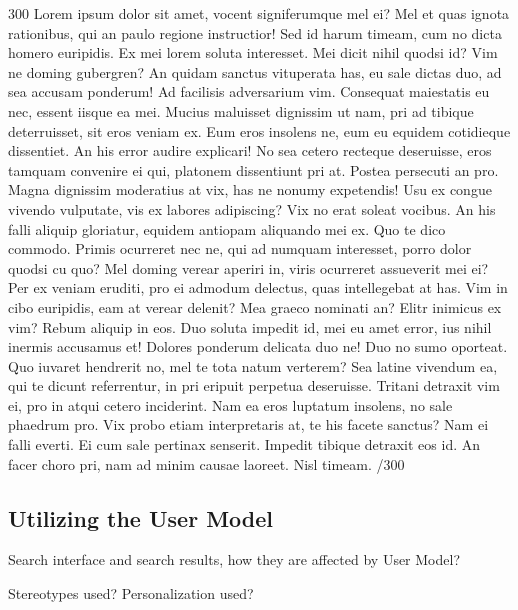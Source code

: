 \documentclass{sigchi}
\begin{document}
300 Lorem ipsum dolor sit amet, vocent signiferumque mel ei? Mel et quas ignota rationibus, qui an paulo regione instructior! Sed id harum timeam, cum no dicta homero euripidis. Ex mei lorem soluta interesset. Mei dicit nihil quodsi id? Vim ne doming gubergren? An quidam sanctus vituperata has, eu sale dictas duo, ad sea accusam ponderum! Ad facilisis adversarium vim. Consequat maiestatis eu nec, essent iisque ea mei. Mucius maluisset dignissim ut nam, pri ad tibique deterruisset, sit eros veniam ex. Eum eros insolens ne, eum eu equidem cotidieque dissentiet. An his error audire explicari! No sea cetero recteque deseruisse, eros tamquam convenire ei qui, platonem dissentiunt pri at. Postea persecuti an pro. Magna dignissim moderatius at vix, has ne nonumy expetendis! Usu ex congue vivendo vulputate, vis ex labores adipiscing? Vix no erat soleat vocibus. An his falli aliquip gloriatur, equidem antiopam aliquando mei ex. Quo te dico commodo. Primis ocurreret nec ne, qui ad numquam interesset, porro dolor quodsi cu quo? Mel doming verear aperiri in, viris ocurreret assueverit mei ei? Per ex veniam eruditi, pro ei admodum delectus, quas intellegebat at has. Vim in cibo euripidis, eam at verear delenit? Mea graeco nominati an? Elitr inimicus ex vim? Rebum aliquip in eos. Duo soluta impedit id, mei eu amet error, ius nihil inermis accusamus et! Dolores ponderum delicata duo ne! Duo no sumo oporteat. Quo iuvaret hendrerit no, mel te tota natum verterem? Sea latine vivendum ea, qui te dicunt referrentur, in pri eripuit perpetua deseruisse. Tritani detraxit vim ei, pro in atqui cetero inciderint. Nam ea eros luptatum insolens, no sale phaedrum pro. Vix probo etiam interpretaris at, te his facete sanctus? Nam ei falli everti. Ei cum sale pertinax senserit. Impedit tibique detraxit eos id. An facer choro pri, nam ad minim causae laoreet. Nisl timeam. /300

\subsection{Utilizing the User Model}

Search interface and search results, how they are affected by User Model?

Stereotypes used? Personalization used?
\end{document}
